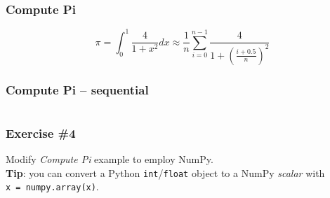 \begin{frame}
  \frametitle{Compute Pi}
  \Large
  \begin{equation*}
    \pi =
    \int_0^1 \frac{4}{1+x^2} dx \approx
    \frac{1}{n}\sum_{i=0}^{n-1}\frac{4}{1+(\frac{i+0.5}{n})^2}
  \end{equation*}
\end{frame}

\begin{frame}[t]
  \frametitle{Compute Pi -- sequential}
  \inputminted[linenos]{python}{compute_pi-seq.py}
\end{frame}



\begin{frame}
  \frametitle{Exercise \#4}
  Modify \emph{Compute Pi} example to employ NumPy.\\
  \smallskip\smallskip
  \textbf{Tip}: you can convert a Python \texttt{int}/\texttt{float}
  object to a NumPy \emph{scalar} with \texttt{x~=~numpy.array(x)}.
\end{frame}
